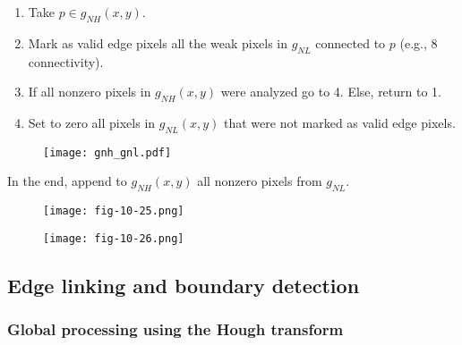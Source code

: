 \begin{frame}
\begin{enumerate}
\item Take $p \in g_{NH}(x,y)$.
\item Mark as valid edge pixels all the weak pixels in $g_{NL}$ connected to $p$ (e.g., 8 connectivity).
\item If all nonzero pixels in $g_{NH}(x,y)$ were analyzed go to 4. Else, return to 1.
\item Set to zero all pixels in $g_{NL}(x,y)$ that were not marked as valid edge pixels.
\end{enumerate}
\begin{figure}[!h]
\texttt{[image: gnh\_gnl.pdf]}
\end{figure}
In the end, append to $g_{NH}(x,y)$ all nonzero pixels from $g_{NL}$.
\end{frame}

\begin{frame}
\begin{figure}[!h]
\texttt{[image: fig-10-25.png]}
\end{figure}
\end{frame}

\begin{frame}
\begin{figure}[!h]
\texttt{[image: fig-10-26.png]}
\end{figure}
\end{frame}

\subsection{Edge linking and boundary detection}

\subsubsection{Global processing using the Hough transform}


